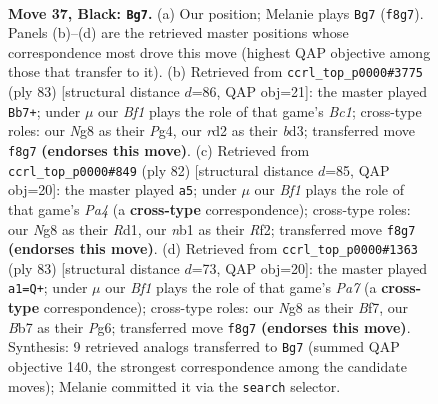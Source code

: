 \documentclass[11pt]{article}
\begin{document}
\clearpage

\begin{figure}[p]\centering
\begin{subfigure}{0.46\textwidth}\centering
\resizebox{\linewidth}{!}{%
\newchessgame
\chessboard[
  setfen={r4bn1/1bp1k3/p1p5/5R2/8/8/3R4/1NB1K3 b - - 0 37},
  showmover=false,
  pgfstyle=straightmove, color=movearrow, markmove={f8-g7}
]}
\caption{}
\end{subfigure}\hfill
\begin{subfigure}{0.46\textwidth}\centering
\resizebox{\linewidth}{!}{%
\newchessgame
\chessboard[
  setfen={2bk4/8/p4p1r/2R5/3P2p1/3B4/PP2N2p/7K b - - 1 42},
  showmover=false,
  pgfstyle=straightmove, color=movearrow, markmove={c8-b7}
]}
\caption{}
\end{subfigure}
\\[4pt]
\begin{subfigure}{0.46\textwidth}\centering
\resizebox{\linewidth}{!}{%
\newchessgame
\chessboard[
  setfen={6r1/7k/pB6/4b3/Pr6/8/5R1P/3R3K w - - 0 42},
  showmover=false,
  pgfstyle=straightmove, color=movearrow, markmove={a4-a5}
]}
\caption{}
\end{subfigure}\hfill
\begin{subfigure}{0.46\textwidth}\centering
\resizebox{\linewidth}{!}{%
\newchessgame
\chessboard[
  setfen={r5k1/5b2/6pp/3p4/3Q4/4R3/p1R3P1/6K1 b - - 0 42},
  showmover=false,
  pgfstyle=straightmove, color=movearrow, markmove={a2-a1}
]}
\caption{}
\end{subfigure}
\caption{\textbf{Move 37, Black: \texttt{Bg7}.} (a) Our position; Melanie plays \texttt{Bg7} (\texttt{f8g7}). Panels (b)--(d) are the retrieved master positions whose correspondence most drove this move (highest QAP objective among those that transfer to it). (b) Retrieved from \texttt{ccrl\_top\_p0000\#3775} (ply 83) [structural distance $d$=86, QAP obj=21]: the master played \texttt{Bb7+}; under $\mu$ our \emph{Bf1} plays the role of that game's \emph{Bc1}; cross-type roles: our \emph{N}g8 as their \emph{P}g4, our \emph{r}d2 as their \emph{b}d3; transferred move \texttt{f8g7} \textbf{(endorses this move)}. (c) Retrieved from \texttt{ccrl\_top\_p0000\#849} (ply 82) [structural distance $d$=85, QAP obj=20]: the master played \texttt{a5}; under $\mu$ our \emph{Bf1} plays the role of that game's \emph{Pa4} (a \textbf{cross-type} correspondence); cross-type roles: our \emph{N}g8 as their \emph{R}d1, our \emph{n}b1 as their \emph{R}f2; transferred move \texttt{f8g7} \textbf{(endorses this move)}. (d) Retrieved from \texttt{ccrl\_top\_p0000\#1363} (ply 83) [structural distance $d$=73, QAP obj=20]: the master played \texttt{a1=Q+}; under $\mu$ our \emph{Bf1} plays the role of that game's \emph{Pa7} (a \textbf{cross-type} correspondence); cross-type roles: our \emph{N}g8 as their \emph{B}f7, our \emph{B}b7 as their \emph{P}g6; transferred move \texttt{f8g7} \textbf{(endorses this move)}. Synthesis: 9 retrieved analogs transferred to \texttt{Bg7} (summed QAP objective 140, the strongest correspondence among the candidate moves); Melanie committed it via the \texttt{search} selector.}
\label{fig:thought-m73}
\end{figure}
\end{document}
